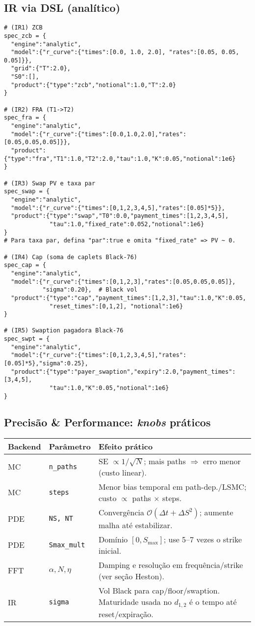 \documentclass[11pt,a4paper]{article}
\begin{document}
\subsection*{IR via DSL (analítico)}
\begin{lstlisting}[style=pystyle]
# (IR1) ZCB
spec_zcb = {
  "engine":"analytic",
  "model":{"r_curve":{"times":[0.0, 1.0, 2.0], "rates":[0.05, 0.05, 0.05]}},
  "grid":{"T":2.0},
  "S0":[],
  "product":{"type":"zcb","notional":1.0,"T":2.0}
}

# (IR2) FRA (T1->T2)
spec_fra = {
  "engine":"analytic",
  "model":{"r_curve":{"times":[0.0,1.0,2.0],"rates":[0.05,0.05,0.05]}},
  "product":{"type":"fra","T1":1.0,"T2":2.0,"tau":1.0,"K":0.05,"notional":1e6}
}

# (IR3) Swap PV e taxa par
spec_swap = {
  "engine":"analytic",
  "model":{"r_curve":{"times":[0,1,2,3,4,5],"rates":[0.05]*5}},
  "product":{"type":"swap","T0":0.0,"payment_times":[1,2,3,4,5],
             "tau":1.0,"fixed_rate":0.052,"notional":1e6}
}
# Para taxa par, defina "par":true e omita "fixed_rate" => PV ~ 0.

# (IR4) Cap (soma de caplets Black-76)
spec_cap = {
  "engine":"analytic",
  "model":{"r_curve":{"times":[0,1,2,3],"rates":[0.05,0.05,0.05]},
           "sigma":0.20},  # Black vol
  "product":{"type":"cap","payment_times":[1,2,3],"tau":1.0,"K":0.05,
             "reset_times":[0,1,2], "notional":1e6}
}

# (IR5) Swaption pagadora Black-76
spec_swpt = {
  "engine":"analytic",
  "model":{"r_curve":{"times":[0,1,2,3,4,5],"rates":[0.05]*5},"sigma":0.25},
  "product":{"type":"payer_swaption","expiry":2.0,"payment_times":[3,4,5],
             "tau":1.0,"K":0.05,"notional":1e6}
}
\end{lstlisting}

\subsection{Precisão \& Performance: \emph{knobs} práticos}
\begin{center}
\begin{tabular}{@{}llp{7.5cm}@{}}
\toprule
Backend & Parâmetro & Efeito prático \\
\midrule
MC & \texttt{n\_paths} & SE $\propto 1/\sqrt{N}$; mais paths $\Rightarrow$ erro menor (custo linear). \\
MC & \texttt{steps} & Menor bias temporal em path-dep./LSMC; custo $\propto$ paths $\times$ steps. \\
PDE & \texttt{NS, NT} & Convergência $\mathcal O(\Delta t + \Delta S^2)$; aumente malha até estabilizar. \\
PDE & \texttt{Smax\_mult} & Domínio $[0, S_{\max}]$; use 5–7 vezes o strike inicial. \\
FFT & $\alpha, N, \eta$ & Damping e resolução em frequência/strike (ver seção Heston). \\
IR & \texttt{sigma} & Vol Black para cap/floor/swaption. Maturidade usada no $d_{1,2}$ é o tempo até reset/expiração. \\
\bottomrule
\end{tabular}
\end{center}
\end{document}
